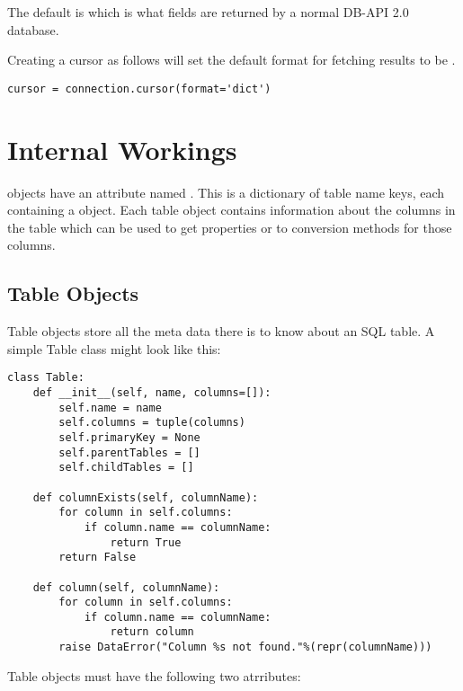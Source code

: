 \documentclass{howto}
\begin{document}
The default is  which is what fields are returned by a normal DB-API 2.0 database.

Creating a cursor as follows will set the default format for fetching results to be .
\begin{verbatim}
cursor = connection.cursor(format='dict')
\end{verbatim}



\section{Internal Workings}

 objects have an attribute named . This is a dictionary of table name keys, each containing a  object. Each table object contains information about the columns in the table which can be used to get properties or to conversion methods for those columns.

\subsection{Table Objects}

Table objects store all the meta data there is to know about an SQL table. A simple Table class might look like this:
\begin{verbatim}
class Table:
    def __init__(self, name, columns=[]):
        self.name = name
        self.columns = tuple(columns)
        self.primaryKey = None
        self.parentTables = []
        self.childTables = []

    def columnExists(self, columnName):
        for column in self.columns:
            if column.name == columnName:
                return True
        return False

    def column(self, columnName):
        for column in self.columns:
            if column.name == columnName:
                return column
        raise DataError("Column %s not found."%(repr(columnName)))
\end{verbatim}

Table objects must have the following two atrributes:
\end{document}
